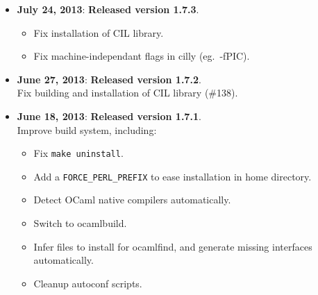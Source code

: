 \documentclass[letterpaper]{article}
\begin{document}
\begin{itemize}
%
\item{\bf July 24, 2013}: {\bf Released version 1.7.3}.\\
  \begin{itemize}
    \item Fix installation of CIL library.
    \item Fix machine-independant flags in cilly (eg.\ -fPIC).
  \end{itemize}

\item{\bf June 27, 2013}: {\bf Released version 1.7.2}.\\
  Fix building and installation of CIL library (\#138).

\item{\bf June 18, 2013}: {\bf Released version 1.7.1}.\\
Improve build system, including:
    \begin{itemize}
      \item Fix \texttt{make uninstall}.
      \item Add a \verb|FORCE_PERL_PREFIX| to ease installation
        in home directory.
      \item Detect OCaml native compilers automatically.
      \item Switch to ocamlbuild.
      \item Infer files to install for ocamlfind, and generate missing
        interfaces automatically.
      \item Cleanup autoconf scripts.
    \end{itemize}


\end{itemize}
\end{document}
